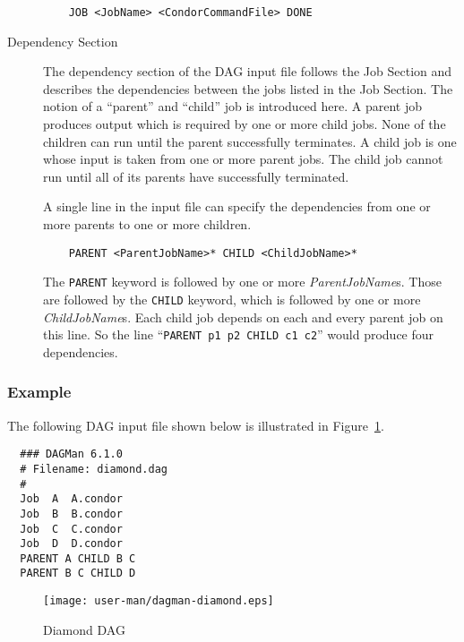 \begin{description}
\begin{verbatim}
	JOB <JobName> <CondorCommandFile> DONE
\end{verbatim}

\item[Dependency Section]

The dependency section of the DAG input file follows the Job Section and
describes the dependencies between the jobs listed in the Job Section.  The
notion of a ``parent'' and ``child'' job is introduced here.  A parent job
produces output which is required by one or more child jobs.  None of the
children can run until the parent successfully terminates.  A child job is one
whose input is taken from one or more parent jobs.  The child job cannot run
until all of its parents have successfully terminated.

A single line in the input file can specify the dependencies from one or more
parents to one or more children.

\begin{verbatim}
	PARENT <ParentJobName>* CHILD <ChildJobName>*
\end{verbatim}

The \texttt{PARENT} keyword is followed by one or more
\textit{ParentJobName}s.  Those are followed by the \texttt{CHILD} keyword,
which is followed by one or more \textit{ChildJobName}s.  Each child job
depends on each and every parent job on this line.  So the line
``\texttt{PARENT p1 p2 CHILD c1 c2}'' would produce four dependencies.

\end{description}

\subsubsection{Example}

The following  DAG input file shown below is illustrated in
Figure~\ref{fig:dagman-diamond}.

\begin{verbatim}
  ### DAGMan 6.1.0
  # Filename: diamond.dag
  #
  Job  A  A.condor 
  Job  B  B.condor 
  Job  C  C.condor	
  Job  D  D.condor
  PARENT A CHILD B C
  PARENT B C CHILD D
\end{verbatim}

\begin{figure}[hbt]
\centering
\texttt{[image: user-man/dagman-diamond.eps]}
\caption{\label{fig:dagman-diamond}Diamond DAG}
\end{figure}

